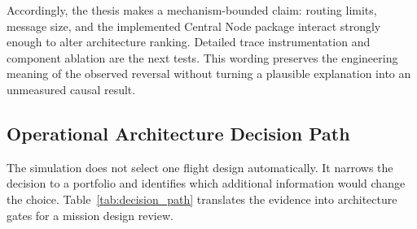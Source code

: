 Accordingly, the thesis makes a mechanism-bounded claim: routing limits, message size, and the implemented Central Node package interact strongly enough to alter architecture ranking. Detailed trace instrumentation and component ablation are the next tests. This wording preserves the engineering meaning of the observed reversal without turning a plausible explanation into an unmeasured causal result.

\clearpage
\subsection{Operational Architecture Decision Path}
\label{sec:operational_decision_path}

The simulation does not select one flight design automatically. It narrows the decision to a portfolio and identifies which additional information would change the choice. Table~\ref{tab:decision_path} translates the evidence into architecture gates for a mission design review.


